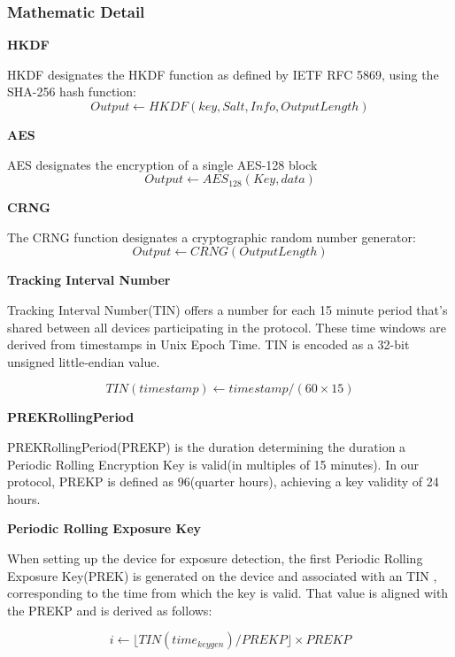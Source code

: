 \documentclass[11pt,en]{elegantpaper}
\begin{document}
\subsubsection{Mathematic Detail}




\textbf{HKDF}

HKDF \cite{briefxip3322b}designates the HKDF function as defined by IETF RFC 5869, using the SHA-256 hash function: 
$$Output\leftarrow HKDF(key,Salt, Info, OutputLength)$$

\textbf{AES}

AES \cite{gueron2020flexible}designates the encryption of a single AES-128 block
$$Output\leftarrow AES_{128}(Key,data)$$

\textbf{CRNG}

The CRNG \cite{datcu2020chaos}function designates a cryptographic random number generator: 
$$Output\leftarrow CRNG(OutputLength)$$

\textbf{Tracking Interval Number}

Tracking Interval Number(TIN) offers a number for each 15 minute period that’s shared between all devices participating in the protocol. These time windows are derived from timestamps in Unix Epoch Time. TIN is encoded as a 32-bit unsigned little-endian value.

$$TIN(timestamp)\leftarrow timestamp/(60\times 15)$$

\textbf{PREKRollingPeriod}

PREKRollingPeriod(PREKP) is the duration determining the duration a Periodic Rolling Encryption Key is valid(in multiples of 15 minutes). In our protocol, PREKP is defined as 96(quarter hours), achieving a key validity of 24 hours. 

\textbf{Periodic Rolling Exposure Key}

When setting up the device for exposure detection, the first Periodic Rolling Exposure Key(PREK) is generated on the device and associated with an TIN , corresponding to the time from which the
key is valid. That value is aligned with the PREKP and is derived as follows: 

$$i\leftarrow \lfloor TIN(time_{keygen})/PREKP\rfloor \times PREKP$$
\end{document}
